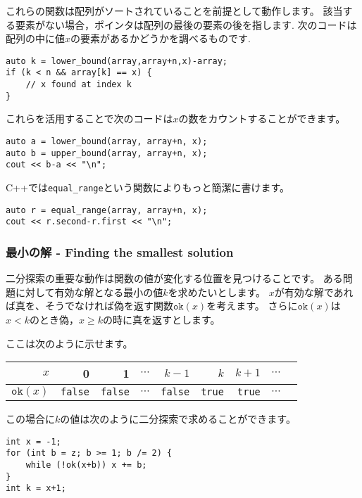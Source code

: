 これらの関数は配列がソートされていることを前提として動作します。
該当する要素がない場合，ポインタは配列の最後の要素の後を指します.
次のコードは配列の中に値$x$の要素があるかどうかを調べるものです.

\begin{lstlisting}
auto k = lower_bound(array,array+n,x)-array;
if (k < n && array[k] == x) {
    // x found at index k
}
\end{lstlisting}

これらを活用することで次のコードは$x$の数をカウントすることができます。

\begin{lstlisting}
auto a = lower_bound(array, array+n, x);
auto b = upper_bound(array, array+n, x);
cout << b-a << "\n";
\end{lstlisting}

C++では\texttt{equal\_range}という関数によりもっと簡潔に書けます。

\begin{lstlisting}
auto r = equal_range(array, array+n, x);
cout << r.second-r.first << "\n";
\end{lstlisting}

\subsubsection{最小の解 - Finding the smallest solution}

二分探索の重要な動作は関数の値が変化する位置を見つけることです。
ある問題に対して有効な解となる最小の値$k$を求めたいとします。
$x$が有効な解であれば真を、そうでなければ偽を返す関数$\texttt{ok}(x)$を考えます。
さらに$\texttt{ok}(x)$は$x<k$のとき偽，$x \ge k$の時に真を返すとします。

ここは次のように示せます。
\begin{center}
\begin{tabular}{r|rrrrrrrr}
$x$ & 0 & 1 & $\cdots$ & $k-1$ & $k$ & $k+1$ & $\cdots$ \\
\hline
$\texttt{ok}(x)$ & \texttt{false} & \texttt{false}
& $\cdots$ & \texttt{false} & \texttt{true} & \texttt{true} & $\cdots$ \\
\end{tabular}
\end{center}

\noindent
この場合に$k$の値は次のように二分探索で求めることができます。

\begin{lstlisting}
int x = -1;
for (int b = z; b >= 1; b /= 2) {
    while (!ok(x+b)) x += b;
}
int k = x+1;
\end{lstlisting}

